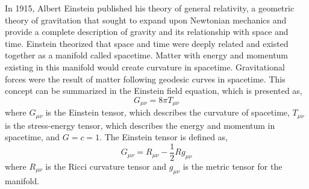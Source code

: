 In 1915, Albert Einstein published his theory of general relativity, a 
geometric theory of gravitation that sought to expand upon Newtonian 
mechanics and provide a complete description of gravity and its 
relationship with space and time. Einstein theorized that space 
and time were deeply related and existed together as a manifold 
called spacetime. Matter with energy and momentum 
existing in this manifold would create 
curvature in spacetime. Gravitational forces were the result of 
matter following geodesic curves in spacetime. This concept can 
be summarized in the Einstein field equation, which is presented 
as,
\begin{equation}
G_{\mu\nu} = 8\pi T_{\mu\nu}
\label{eq:EFE}
\end{equation}
where $G_{\mu\nu}$ is the Einstein tensor, which describes the 
curvature of spacetime, $T_{\mu\nu}$ is the 
stress-energy tensor, which describes the energy and momentum in 
spacetime, and  $G=c=1$. The Einstein tensor is defined as,
\begin{equation}
G_{\mu\nu} = R_{\mu\nu} - \frac{1}{2}Rg_{\mu\nu}
\end{equation}
where $R_{\mu\nu}$ is the Ricci curvature tensor and $g_{\mu\nu}$ is 
the metric tensor for the manifold.


